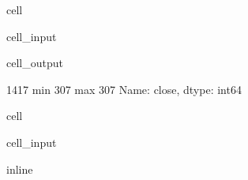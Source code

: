\documentclass[letterpaper,10pt,english]{jupyterBook}
\begin{document}
\begin{sphinxuseclass}{cell}\begin{sphinxVerbatimInput}

\begin{sphinxuseclass}{cell_input}
\begin{sphinxVerbatim}[commandchars=\\\{\}]
\PYG{p}{[}\PYG{p}{]}
\PYG{p}{[}\PYG{p}{]}\PYG{p}{[}\PYG{p}{]}
\end{sphinxVerbatim}

\end{sphinxuseclass}\end{sphinxVerbatimInput}
\begin{sphinxVerbatimOutput}

\begin{sphinxuseclass}{cell_output}
\begin{sphinxVerbatim}[commandchars=\\\{\}]
1417
min    307
max    307
Name: close, dtype: int64
\end{sphinxVerbatim}

\end{sphinxuseclass}\end{sphinxVerbatimOutput}

\end{sphinxuseclass}
\begin{sphinxuseclass}{cell}\begin{sphinxVerbatimInput}

\begin{sphinxuseclass}{cell_input}
\begin{sphinxVerbatim}[commandchars=\\\{\}]
   
   
   
 inline
  
\end{sphinxVerbatim}

\end{sphinxuseclass}\end{sphinxVerbatimInput}

\end{sphinxuseclass}
\end{document}
